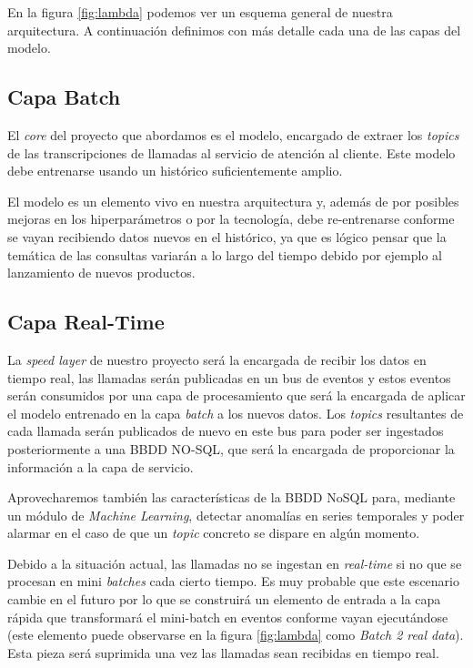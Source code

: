 En la figura \ref{fig:lambda} podemos ver un esquema general de nuestra arquitectura. A continuación definimos con más detalle cada una de las capas del modelo.




\subsection{Capa Batch}
El \textit{core} del proyecto que abordamos es el modelo, encargado de extraer los \textit{topics} de las transcripciones de llamadas al servicio de atención al cliente. Este modelo debe entrenarse usando un histórico suficientemente amplio. 

El modelo es un elemento vivo en nuestra arquitectura y, además de por posibles mejoras en los hiperparámetros o por la tecnología, debe re-entrenarse conforme se vayan recibiendo datos nuevos en el histórico, ya que es lógico pensar que la temática de las consultas variarán a lo largo del tiempo debido por ejemplo al lanzamiento de nuevos productos. 


\subsection{Capa Real-Time}
La \textit{speed layer} de nuestro proyecto será la encargada de recibir los datos en tiempo real, las llamadas serán publicadas en un bus de eventos y estos eventos serán consumidos por una capa de procesamiento que será la encargada de aplicar el modelo entrenado en la capa \textit{batch} a los nuevos datos. Los \textit{topics} resultantes de cada llamada serán publicados de nuevo en este bus para poder ser ingestados posteriormente a una BBDD NO-SQL, que será la encargada de proporcionar la información a la capa de servicio. 

Aprovecharemos también las características de la BBDD NoSQL para, mediante un módulo de \textit{Machine Learning}, detectar anomalías en series temporales y poder alarmar en el caso de que un \textit{topic} concreto se dispare en algún momento.  

Debido a la situación actual, las llamadas no se ingestan en \textit{real-time} si no que se procesan en mini \textit{batches} cada cierto tiempo. Es muy probable que este escenario cambie en el futuro por lo que se construirá un elemento de entrada a la capa rápida que transformará el mini-batch en eventos conforme vayan ejecutándose (este elemento puede observarse en la figura \ref{fig:lambda} como \textit{Batch 2 real data}). Esta pieza será suprimida una vez las llamadas sean recibidas en tiempo real. 


